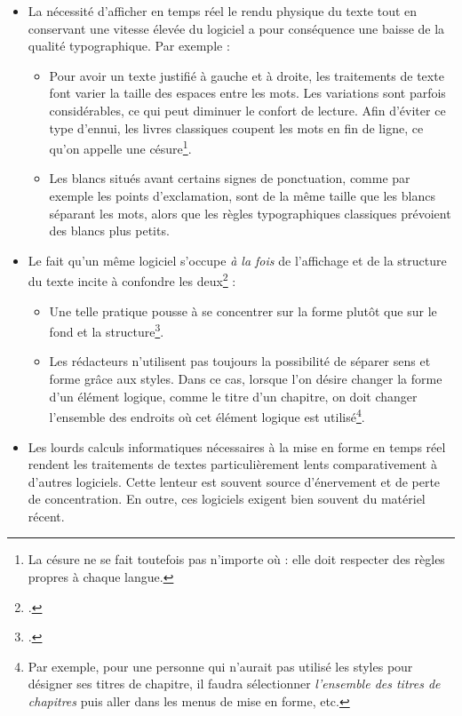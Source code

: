 \begin{itemize}
\item La nécessité d'afficher en temps réel le rendu physique du texte tout en conservant une vitesse élevée du logiciel a pour conséquence une baisse de la qualité typographique. Par exemple :
	\begin{itemize}
		\item Pour avoir un texte justifié à gauche et à droite, les traitements de texte font varier la taille des espaces entre les mots. Les variations sont parfois considérables, ce qui peut diminuer le confort de lecture. Afin d'éviter ce type d'ennui, les livres classiques coupent les mots en fin de ligne, ce qu'on appelle une césure\footnote{La césure ne se fait toutefois pas n'importe où : elle doit respecter des règles propres à chaque langue.}.
		\item Les blancs situés avant certains signes de ponctuation, comme par exemple les points d'exclamation, sont de  la même taille que les blancs séparant les mots, alors que les règles typographiques classiques prévoient des blancs plus petits.
	\end{itemize}
\item Le fait qu'un même logiciel s'occupe \emph{à la fois} de l'affichage et de la structure du texte incite à confondre les deux\footcite[L'auteur de ces lignes est moins sévère envers les traitements de texte que d'autres LaTeXiens : \cf][]{stupide}  :
	\begin{itemize}
		\item Une telle pratique pousse à se concentrer sur la forme plutôt que sur le fond et la structure\footcite[Toutefois en théorie la formation universitaire en sciences humaines incite à penser \emph{structure et sens d'abord}. Voir un débat sur le blog de l'auteur :][]{structurevsforme}. 
		\item Les rédacteurs n'utilisent pas toujours la possibilité de séparer sens et forme grâce aux styles. Dans ce cas, lorsque l'on désire changer la forme d'un élément logique, comme  le titre d'un chapitre, on doit changer l'ensemble des endroits où cet élément logique est utilisé\footnote{Par exemple, pour une personne  qui n'aurait pas utilisé les styles pour désigner ses titres de chapitre, il faudra sélectionner \emph{l'ensemble des titres de chapitres} puis aller dans les menus de mise en forme, etc.}.
	\end{itemize}

\item Les lourds calculs informatiques nécessaires à la mise en forme en temps réel rendent les traitements de textes particulièrement lents comparativement à d'autres logiciels. Cette lenteur est souvent source d'énervement et de perte de concentration. En outre, ces logiciels exigent bien souvent du matériel récent.
\end{itemize}

